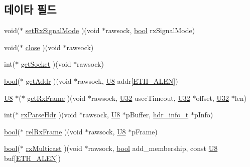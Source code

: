 \subsection*{데이타 필드}
\begin{DoxyCompactItemize}
\item 
void($\ast$ \hyperlink{structrawsock__cb__t_a8140f6cfcb74252d279c85de02fa0c1a}{set\+Rx\+Signal\+Mode} )(void $\ast$rawsock, \hyperlink{avb__gptp_8h_af6a258d8f3ee5206d682d799316314b1}{bool} rx\+Signal\+Mode)
\item 
void($\ast$ \hyperlink{structrawsock__cb__t_a985e065be665d4efc528911317edb3fa}{close} )(void $\ast$rawsock)
\item 
int($\ast$ \hyperlink{structrawsock__cb__t_a07a3216facf720770cc7a9f92d86496c}{get\+Socket} )(void $\ast$rawsock)
\item 
\hyperlink{avb__gptp_8h_af6a258d8f3ee5206d682d799316314b1}{bool}($\ast$ \hyperlink{structrawsock__cb__t_a3e0f8de868f8572b6af34c09d8d2ee41}{get\+Addr} )(void $\ast$rawsock, \hyperlink{openavb__types__base__pub_8h_aa63ef7b996d5487ce35a5a66601f3e73}{U8} addr\mbox{[}\hyperlink{avb__avtp_8h_a9822d89774e0d6ddaa06503950130423}{E\+T\+H\+\_\+\+A\+L\+EN}\mbox{]})
\item 
\hyperlink{openavb__types__base__pub_8h_aa63ef7b996d5487ce35a5a66601f3e73}{U8} $\ast$($\ast$ \hyperlink{structrawsock__cb__t_ae9c0b8e9e26d88a6d7ef3191fec6cd5a}{get\+Rx\+Frame} )(void $\ast$rawsock, \hyperlink{openavb__types__base__pub_8h_a696390429f2f3b644bde8d0322a24124}{U32} usec\+Timeout, \hyperlink{openavb__types__base__pub_8h_a696390429f2f3b644bde8d0322a24124}{U32} $\ast$offset, \hyperlink{openavb__types__base__pub_8h_a696390429f2f3b644bde8d0322a24124}{U32} $\ast$len)
\item 
int($\ast$ \hyperlink{structrawsock__cb__t_a21ebeb1cf85f9d386cbe5c3e9f46a1d4}{rx\+Parse\+Hdr} )(void $\ast$rawsock, \hyperlink{openavb__types__base__pub_8h_aa63ef7b996d5487ce35a5a66601f3e73}{U8} $\ast$p\+Buffer, \hyperlink{structhdr__info__t}{hdr\+\_\+info\+\_\+t} $\ast$p\+Info)
\item 
\hyperlink{avb__gptp_8h_af6a258d8f3ee5206d682d799316314b1}{bool}($\ast$ \hyperlink{structrawsock__cb__t_a428063ea57178d7db91ee180d7028101}{rel\+Rx\+Frame} )(void $\ast$rawsock, \hyperlink{openavb__types__base__pub_8h_aa63ef7b996d5487ce35a5a66601f3e73}{U8} $\ast$p\+Frame)
\item 
\hyperlink{avb__gptp_8h_af6a258d8f3ee5206d682d799316314b1}{bool}($\ast$ \hyperlink{structrawsock__cb__t_a0683e53a5342e7e7aa9755ffcccb49cb}{rx\+Multicast} )(void $\ast$rawsock, \hyperlink{avb__gptp_8h_af6a258d8f3ee5206d682d799316314b1}{bool} add\+\_\+membership, const \hyperlink{openavb__types__base__pub_8h_aa63ef7b996d5487ce35a5a66601f3e73}{U8} buf\mbox{[}\hyperlink{avb__avtp_8h_a9822d89774e0d6ddaa06503950130423}{E\+T\+H\+\_\+\+A\+L\+EN}\mbox{]})

\end{DoxyCompactItemize}
